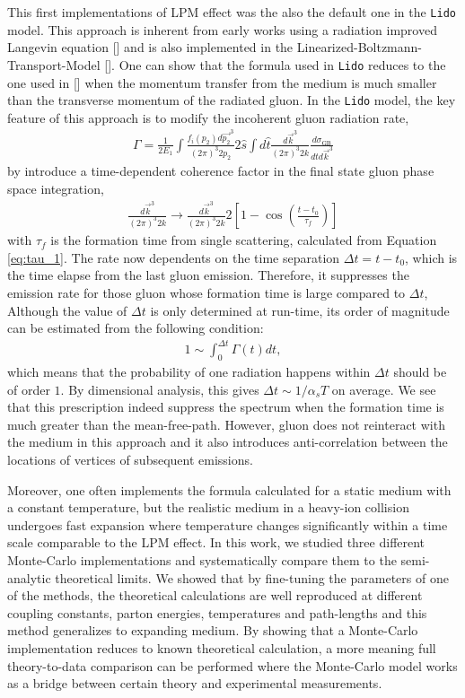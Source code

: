 \documentclass[aps, prc, reprint, amsmath, groupedaddress, nofootinbib]{revtex4-1}
\begin{document}
This first implementations of LPM effect was the also the default one in the {\tt Lido} model. 
This approach is inherent from early works using a radiation improved Langevin equation [] and is also implemented in the Linearized-Boltzmann-Transport-Model []. 
One can show that the formula used in {\tt Lido} reduces to the one used in [] when the momentum transfer from the medium is much smaller than the transverse momentum of the radiated gluon.
In the {\tt Lido} model, the key feature of this approach is to modify the incoherent gluon radiation rate,
\begin{eqnarray}
\Gamma = \frac{1}{2E_1}\int\frac{f_i(p_2)d\vec{p_2}^3}{(2\pi)^3 2p_2}2\hat{s}\int d\hat{t}\frac{d\vec{k}^3}{(2\pi)^3 2k}\frac{d\sigma_{\textrm{GB}}}{d\hat{t}d\vec{k}^3}
\end{eqnarray}
by introduce a time-dependent coherence factor in the final state gluon phase space integration,
\begin{eqnarray}
\frac{d\vec{k}^3}{(2\pi)^3 2k} \rightarrow \frac{d\vec{k}^3}{(2\pi)^3 2k} 2\left[1-\cos\left(\frac{t-t_0}{\tau_f}\right)\right]
\end{eqnarray}
with $\tau_f$ is the formation time from single scattering, calculated from Equation \ref{eq:tau_1}. 
The rate now dependents on the time separation $\Delta t = t-t_0$, which is the time elapse from the last gluon emission.
Therefore, it suppresses the emission rate for those gluon whose formation time is large compared to $\Delta t$, 
Although the value of $\Delta t$ is only determined at run-time,
its order of magnitude can be estimated from the following condition:
\begin{eqnarray}
1 \sim \int_0^{\Delta t}\Gamma(t) dt,
\end{eqnarray}
which means that the probability of one radiation happens within $\Delta t$ should be of order $1$.
By dimensional analysis, this gives $\Delta t \sim 1/\alpha_s T$ on average.
We see that this prescription indeed suppress the spectrum when the formation time is much greater than the mean-free-path.
However, gluon does not reinteract with the medium in this approach and it also introduces anti-correlation between the locations of vertices of subsequent emissions.

Moreover, one often implements the formula calculated for a static medium with a constant temperature, but the realistic medium in a heavy-ion collision undergoes fast expansion where temperature changes significantly within a time scale comparable to the LPM effect.
In this work, we studied three different Monte-Carlo implementations and systematically compare them to the semi-analytic theoretical limits.
We showed that by fine-tuning the parameters of one of the methods, the theoretical calculations are well reproduced at different coupling constants, parton energies, temperatures and path-lengths and this method generalizes to expanding medium. 
By showing that a Monte-Carlo implementation reduces to known theoretical calculation, a more meaning full theory-to-data comparison can be performed where the Monte-Carlo model works as a bridge between certain theory and experimental measurements.
\end{document}
